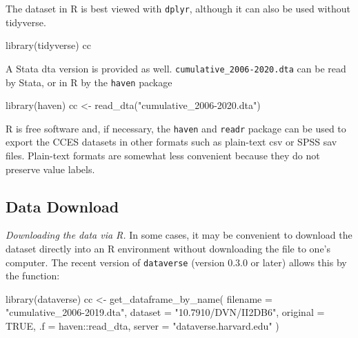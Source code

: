 \documentclass[10pt,article,oneside]{memoir}
\theoremstyle{definition}
\newenvironment{Shaded}{\begin{snugshade}}{\end{snugshade}}
\newcommand{\AttributeTok}[1]{\textcolor[rgb]{0.77,0.63,0.00}{#1}}
\newcommand{\ConstantTok}[1]{\textcolor[rgb]{0.00,0.00,0.00}{#1}}
\newcommand{\FunctionTok}[1]{\textcolor[rgb]{0.00,0.00,0.00}{#1}}
\newcommand{\NormalTok}[1]{#1}
\newcommand{\OtherTok}[1]{\textcolor[rgb]{0.56,0.35,0.01}{#1}}
\newcommand{\SpecialCharTok}[1]{\textcolor[rgb]{0.00,0.00,0.00}{#1}}
\newcommand{\StringTok}[1]{\textcolor[rgb]{0.31,0.60,0.02}{#1}}
\begin{document}
\noindent The dataset in R is best viewed with \texttt{dplyr}, although
it can also be used without tidyverse.

\begin{Shaded}
\begin{Highlighting}[]
\FunctionTok{library}\NormalTok{(tidyverse)}
\NormalTok{cc}
\end{Highlighting}
\end{Shaded}

\noindent  A Stata dta version is provided as well.
\texttt{cumulative\_2006-2020.dta} can be read by Stata, or in R by the
\texttt{haven} package

\begin{Shaded}
\begin{Highlighting}[]
\FunctionTok{library}\NormalTok{(haven)}
\NormalTok{cc }\OtherTok{\textless{}{-}} \FunctionTok{read\_dta}\NormalTok{(}\StringTok{"cumulative\_2006{-}2020.dta"}\NormalTok{)}
\end{Highlighting}
\end{Shaded}

R is free software and, if necessary, the \texttt{haven} and
\texttt{readr} package can be used to export the CCES datasets in other
formats such as plain-text csv or SPSS sav files. Plain-text formats are
somewhat less convenient because they do not preserve value labels.

\hypertarget{data-download}{%
\subsection{Data Download}\label{data-download}}

\noindent \emph{Downloading the data via R.} In some cases, it may be
convenient to download the dataset directly into an R environment
without downloading the file to one's computer. The recent version of
\texttt{dataverse} (version 0.3.0 or later) allows this by the function:

\begin{Shaded}
\begin{Highlighting}[]
\FunctionTok{library}\NormalTok{(dataverse)}
\NormalTok{cc }\OtherTok{\textless{}{-}} \FunctionTok{get\_dataframe\_by\_name}\NormalTok{(}
  \AttributeTok{filename =} \StringTok{"cumulative\_2006{-}2019.dta"}\NormalTok{,}
  \AttributeTok{dataset =} \StringTok{"10.7910/DVN/II2DB6"}\NormalTok{,}
  \AttributeTok{original =} \ConstantTok{TRUE}\NormalTok{,}
  \AttributeTok{.f =}\NormalTok{ haven}\SpecialCharTok{::}\NormalTok{read\_dta,}
  \AttributeTok{server =} \StringTok{"dataverse.harvard.edu"}
\NormalTok{)}
\end{Highlighting}
\end{Shaded}
\end{document}
